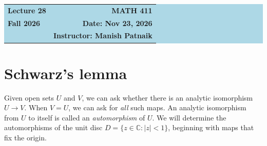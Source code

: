 \documentclass[11pt]{article}
\theoremstyle{plain}
\theoremstyle{definition}
\theoremstyle{boldremark}
\theoremstyle{remark}
\numberwithin{equation}{section}
\newcommand{\C}{\mathbb{C}}
\begin{document}
\begin{center}
  \colorbox{lightblue}{%
    \begin{minipage}{0.94\textwidth}
      \vspace{0.55em}
      \begin{tabular*}{\textwidth}{@{\extracolsep{\fill}}lr}
        {\color{courseblue}\bfseries\LARGE Lecture 28} &
        {\color{courseblue}\bfseries\LARGE MATH 411}\\[0.35em]
        \textbf{Fall 2026} & \textbf{Date: Nov 23, 2026}\\
        & \textbf{Instructor: Manish Patnaik}
      \end{tabular*}
      \vspace{0.45em}
    \end{minipage}}
\end{center}

\setcounter{tocdepth}{1}
\tableofcontents
\vspace{0.45em}

\section{Schwarz's lemma}
Given open sets $U$ and $V$, we can ask whether there is an analytic
isomorphism $U\to V$. When $V=U$, we can ask for \emph{all} such maps.
An analytic isomorphism from $U$ to itself is called an
\emph{automorphism} of $U$. We will determine the automorphisms of the
unit disc $D=\{z\in\C:|z|<1\}$, beginning with maps that fix the origin.
\end{document}
